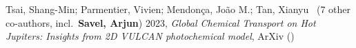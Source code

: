 \item[{\color{numcolor}\scriptsize1}] Tsai, Shang-Min; Parmentier, Vivien; Mendon{\c{c}}a, Jo{\~a}o M.; Tan, Xianyu \etal\ ({7} other co-authors, incl.\ \textbf{Savel, Arjun}) 2023, \emph{Global Chemical Transport on Hot Jupiters: Insights from 2D VULCAN photochemical model}, ArXiv ()